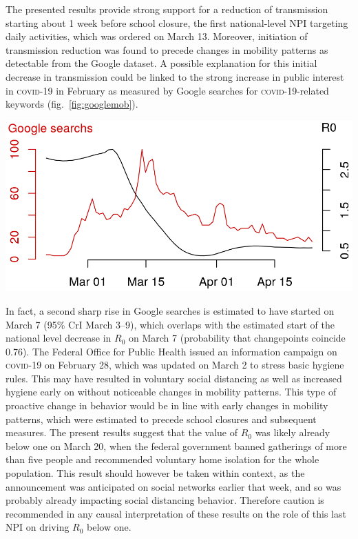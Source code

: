 The presented results provide strong support for a reduction of transmission starting about 1 week before school closure, the first national-level NPI targeting daily activities, which was ordered on March 13. Moreover, initiation of transmission reduction was found to precede changes in mobility patterns as detectable from the Google dataset. A possible explanation for this initial decrease in transmission could be linked to the strong increase in public interest in \textsc{covid}-19 in February as measured by Google searches for \textsc{covid}-19-related keywords (fig.~\ref{fig:googlemob}).
\begin{marginfigure}[1\baselineskip]
\includegraphics{fig_covid-switzerland-npi/fig_supp/google_trends.png}
\label{fig:googlemob}
\end{marginfigure}
 In fact, a second sharp rise in Google searches is estimated to have started on March 7 (95\% CrI March 3–9), which overlaps with the estimated start of the national level decrease in $R_0$ on March 7 (probability that changepoints coincide 0.76). The Federal Office for Public Health issued an information campaign on \textsc{covid}-19 on February 28, which was updated on March 2 to stress basic hygiene rules\cite{OFSP:NouvellesReglesHygiene:2020}. This may have resulted in voluntary social distancing as well as increased hygiene early on without noticeable changes in mobility patterns. This type of proactive change in behavior would be in line with early changes in mobility patterns, which were estimated to precede school closures and subsequent measures. The present results suggest that the value of $R_0$ was likely already below one on March 20, when the federal government banned gatherings of more than five people and recommended voluntary home isolation for the whole population. This result should however be taken within context, as the announcement was anticipated on social networks earlier that week, and so was probably already impacting social distancing behavior. 
Therefore caution is recommended in any causal interpretation of these results on the role of this last NPI on driving $R_0$ below one.

